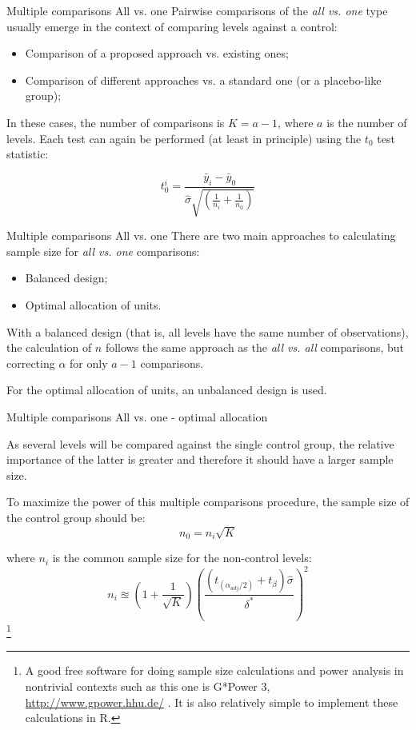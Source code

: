 \begin{frame}
{Multiple comparisons}
{All vs. one}
Pairwise comparisons of the \textit{all vs. one} type usually emerge in the context of comparing levels against a control:

\begin{itemize}
  \item Comparison of a proposed approach vs. existing ones;
  \item Comparison of different approaches vs. a standard one (or a placebo-like group);
\end{itemize}
In these cases, the number of comparisons is $K = a-1$, where $a$ is the number of levels. Each test can again be performed (at least in principle) using the $t_0$ test statistic:

\begin{equation*}
t^i_0 = \frac{\bar{y}_i - \bar{y}_0}{\hat{\sigma}\sqrt{\left(\frac{1}{n_i}+\frac{1}{n_0}\right)}}
\end{equation*}
\end{frame}
%
%
\begin{frame}
{Multiple comparisons}
{All vs. one}
There are two main approaches to calculating sample size for \textit{all vs. one} comparisons:

\begin{itemize}
  \item Balanced design;
  \item Optimal allocation of units.
\end{itemize}

With a balanced design (that is, all levels have the same number of observations), the calculation of $n$ follows the same approach as the \textit{all vs. all} comparisons, but correcting $\alpha$ for only $a-1$ comparisons.\bigskip

For the optimal allocation of units, an unbalanced design is used.
\end{frame}
%
%
\begin{frame}
{Multiple comparisons}
{All vs. one - optimal allocation}

As several levels will be compared against the single control group, the relative importance of the latter is greater and therefore it should have a larger sample size.
\bigskip

To maximize the power of this multiple comparisons procedure, the sample size of the control group should be:
\begin{equation*}
n_0 = n_i\sqrt{K}
\end{equation*}

\noindent where $n_i$ is the common sample size for the non-control levels:
\begin{equation*}
n_i \approxeq \left(1 + \frac{1}{\sqrt{K}}\right)\left(\frac{(t_{(\alpha_{adj}/2)}+t_{\beta})\hat{\sigma}}{\delta^*}\right)^2
\end{equation*}
\footnote{A good free software for doing sample size calculations and power analysis in nontrivial contexts such as this one is G*Power 3, \url{http://www.gpower.hhu.de/} . It is also relatively simple to implement these calculations in R.}
\end{frame}
